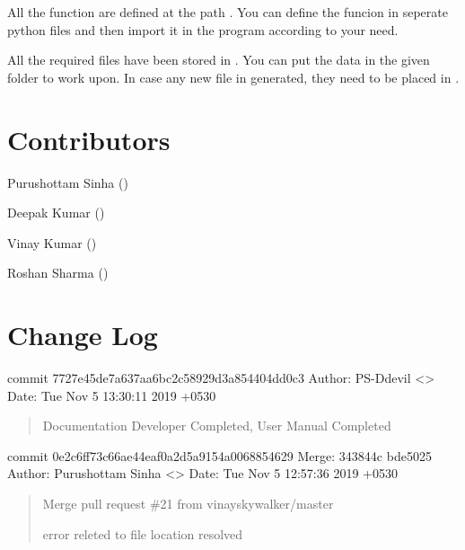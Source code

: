 \documentclass[letterpaper,10pt,english]{sphinxmanual}
\begin{document}
All the function are defined at the path . You can define the funcion in seperate python files and then import it in the program according to your need.


All the required files have been stored in . You can put the data in the given folder to work upon. In case any new file in generated, they need to be placed in .


\chapter{Contributors}
\label{\detokenize{contributors:contributors}}\label{\detokenize{contributors::doc}}
Purushottam Sinha ()

Deepak Kumar ()

Vinay Kumar ()

Roshan Sharma ()


\chapter{Change Log}
\label{\detokenize{change:change-log}}\label{\detokenize{change::doc}}
commit 7727e45de7a637aa6bc2c58929d3a854404dd0c3
Author: PS-Ddevil \textless{}\textgreater{}
Date:   Tue Nov 5 13:30:11 2019 +0530
\begin{quote}

Documentation Developer Completed, User Manual Completed
\end{quote}

commit 0e2c6ff73c66ae44eaf0a2d5a9154a0068854629
Merge: 343844c bde5025
Author: Purushottam Sinha \textless{}\textgreater{}
Date:   Tue Nov 5 12:57:36 2019 +0530
\begin{quote}

Merge pull request \#21 from vinayskywalker/master

error releted to file location resolved
\end{quote}
\end{document}
